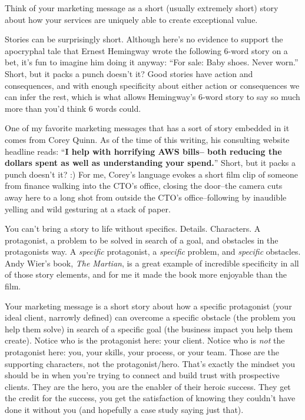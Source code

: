 Think of your marketing message as a short (usually extremely short) story about how your services are uniquely able to create exceptional value.

Stories can be surprisingly short. Although here's no evidence to support the apocryphal tale that Ernest Hemingway wrote the following 6-word story on a bet, it's fun to imagine him doing it anyway: “For sale: Baby shoes. Never worn.” Short, but it packs a punch doesn't it? Good stories have action and consequences, and with enough specificity about either action or consequences we can infer the rest, which is what allows Hemingway's 6-word story to say so much more than you'd think 6 words could.

One of my favorite marketing messages that has a sort of story embedded in it comes from Corey Quinn. As of the time of this writing, his consulting website headline reads: ``\textbf{I help with horrifying AWS bills-- both reducing the dollars spent as well as understanding your spend.}'' Short, but it packs a punch doesn't it? :) For me, Corey's language evokes a short film clip of someone from finance walking into the CTO's office, closing the door--the camera cuts away here to a long shot from outside the CTO's office--following by inaudible yelling and wild gesturing at a stack of paper.

You can't bring a story to life without specifics. Details. Characters. A protagonist, a problem to be solved in search of a goal, and obstacles in the protagonists way. A \emph{specific} protagonist, a \emph{specific} problem, and \emph{specific} obstacles. Andy Wier's book, \emph{The Martian}, is a great example of incredible specificity in all of those story elements, and for me it made the book more enjoyable than the film.

Your marketing message is a short story about how a specific protagonist (your ideal client, narrowly defined) can overcome a specific obstacle (the problem you help them solve) in search of a specific goal (the business impact you help them create). Notice who is the protagonist here: your client. Notice who is \emph{not} the protagonist here: you, your skills, your process, or your team. Those are the supporting characters, not the protagonist/hero. That's exactly the mindset you should be in when you're trying to connect and build trust with prospective clients. They are the hero, you are the enabler of their heroic success. They get the credit for the success, you get the satisfaction of knowing they couldn't have done it without you (and hopefully a case study saying just that).

